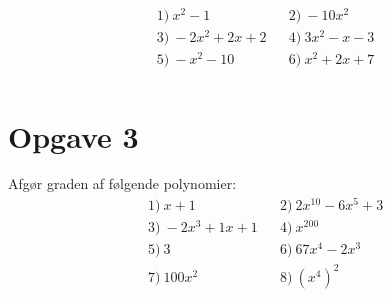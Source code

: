 \begin{align*}
&1) \  x^2-1   &&2) \ -10x^2    \\
&3) \   -2x^2+2x+2  &&4) \  3x^2-x-3   \\
&5) \ -x^2-10    &&6) \  x^2+2x+7   \\
\end{align*}


\section*{Opgave 3}
Afgør graden af følgende polynomier:
\begin{align*}
 &1) \ x+1  &&2) \  2x^{10}-6x^5+3  \\
  &3) \ -2x^3+1x+1  &&4) \  x^{200}  \\
   &5) \ 3  &&6) \  67x^4-2x^3  \\
    &7) \ 100x^2  &&8) \  \left(x^4\right)^2  \\
\end{align*}